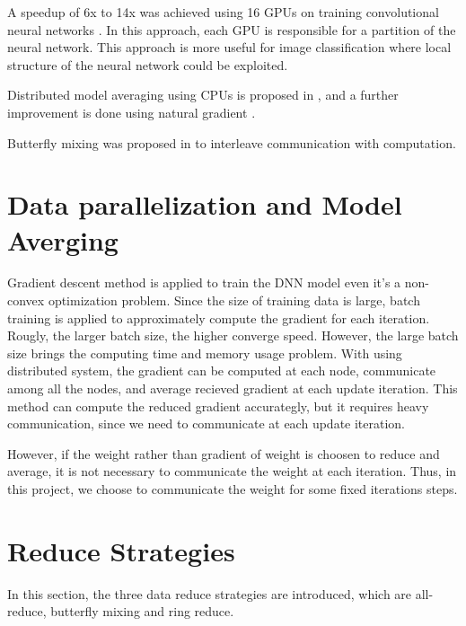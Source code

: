 \documentclass{article}
\begin{document}
A speedup of 6x to 14x was achieved using 16 GPUs on training convolutional neural networks \cite{coates2013deep}. In this approach,
each GPU is responsible for a partition of the neural network. This approach is more useful for image classification where 
local structure of the neural network could be exploited.

Distributed model averaging using CPUs is proposed in \cite{zhang2014improving},
and a further improvement is done using natural gradient \cite{povey2014parallel}.

Butterfly mixing was proposed in \cite{zhao2013butterfly} to interleave communication with computation.

\section{Data parallelization and Model Averging}
Gradient descent method is applied to train the DNN model even it's a non-convex optimization problem. 
Since the size of training data is large, batch training is applied to approximately compute the 
gradient for each iteration. Rougly, the larger batch size, the higher converge speed. However, 
the large batch size brings the computing time and memory usage problem. With using distributed 
system, the gradient can be computed at each node, communicate among all the nodes, and average 
recieved gradient at each update iteration. This method can compute the reduced gradient 
accurategly, but it requires heavy communication, since we need to communicate at each update iteration.

However, if the weight rather than gradient of weight is choosen to reduce and average, 
it is not necessary to communicate the weight at each iteration. Thus, in this project, 
we choose to communicate the weight for some fixed iterations steps. 

\section{Reduce Strategies}
In this section, the three data reduce strategies are introduced, which are all-reduce, 
butterfly mixing and ring reduce.
\end{document}
